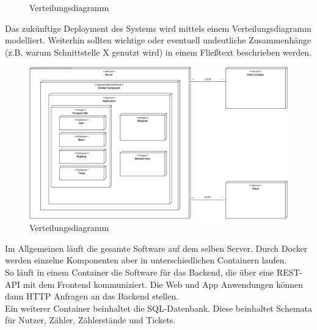 \begin{figure}[h]
	\centering
	\caption{Verteilungsdiagramm}
	\label{fig:verteilungsdiagramm}
\end{figure}

\begin{tcolorbox}
	Das zukünftige Deployment des Systems wird mittels einem Verteilungsdiagramm modelliert.
	Weiterhin sollten wichtige oder eventuell undeutliche Zusammenhänge (z.B. warum Schnittstelle X genutzt wird) in einem Fließtext beschrieben werden.
\end{tcolorbox}

\begin{figure}[H]
	\centering
	\caption{Verteilungsdiagramm}
	\includegraphics[width=16cm]{img/Diagrams/DeploymentDiagram}
\end{figure}

Im Allgemeinen läuft die gesamte Software auf dem selben Server. Durch Docker werden einzelne Komponenten aber in unterschiedlichen Containern laufen.\\
So läuft in einem Container die Software für das Backend, die über eine REST-API mit dem Frontend kommuniziert. Die Web und App Anwendungen können dann HTTP Anfragen an das Backend stellen.\\
Ein weiterer Container beinhaltet die SQL-Datenbank. Diese beinhaltet Schemata für Nutzer, Zähler, Zählerstände und Tickets.
